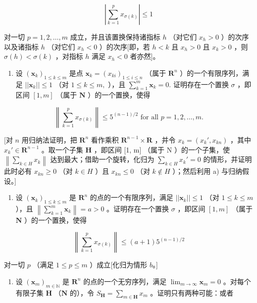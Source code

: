 \[
\left| \sum_ {k = 1} ^ {p} x _ {\sigma (k)} \right| \leqslant 1
\]

对一切 \(p = 1, 2, \ldots, m\) 成立，并且该置换保持诸指标 \(h\) （对它们 \(x_h > 0\) ）的次序以及诸指标 \(h\) （对它们 \(x_h < 0\) ）的次序{[}即，若 \(h < k\) 且 \(x_h > 0\) 且 \(x_k > 0\) ，则 \(\sigma(h) < \sigma(k)\) ，对指标 \(h\) 满足 \(x_h < 0\) 者亦然{]}。

\begin{enumerate}
\def\labelenumi{\alph{enumi})}
\setcounter{enumi}{1}
\tightlist
\item
  设 \((\pmb{x}_k)_{1\leqslant k\leqslant m}\) 是点 \(\pmb{x}_k = (x_{ki})_{1\leqslant i\leqslant n}\) （属于 \(\mathbf{R}^n\) ）的一个有限序列，满足 \(||\pmb{x}_k||\leqslant 1\) （对 \(1\leqslant k\leqslant m,\) ），且 \(\sum_{k = 1}^{m}\pmb{x}_k = 0.\) 证明存在一个置换 \(\sigma\) ，即区间 \([1, m]\) （属于 \(\mathbf{N}\) ）的一个置换，使得
\end{enumerate}

\[
\left\| \sum_ {k = 1} ^ {p} x _ {\sigma (k)} \right\| \leqslant 5 ^ {(n - 1) / 2} \text { for   all } p = 1, 2, \dots , m.
\]

{[}对 \(n\) 用归纳法证明，把 \(\mathbf{R}^n\) 看作乘积 \(\mathbf{R}^{n-1} \times \mathbf{R}\) ，并令 \(x_k = (x_k', x_{kn})\) ，其中 \(x_k' \in \mathbf{R}^{n-1}\) 。取一个子集 \(\mathbf{H}\) ，即区间 {[}1, m{]} （属于 N ）的一个子集，使 \(\left\|\sum_{k\in H}x_{k}\right\|\) 达到最大；借助一个旋转，化归为 \(\sum_{k\in H}x_{k}'=0\) 的情形，并证明此时必有 \(x_{kn}\geqslant0\) （对 \(k\in H\) ）且 \(x_{kn}\leqslant0\) （对 \(k\notin H\) ）；然后利用 a) 与归纳假设。{]}

\begin{enumerate}
\def\labelenumi{\alph{enumi})}
\setcounter{enumi}{2}
\tightlist
\item
  设 \((\pmb{x}_k)_{1 \leqslant k \leqslant m}\) 是 \(\mathbf{R}^n\) 的点的一个有限序列，满足 \(||\pmb{x}_k|| \leqslant 1\) （对 \(1 \leqslant k \leqslant m\) ），且 \(\left\| \sum_{k=1}^{m} \pmb{x}_k \right\| = a > 0\) 。证明存在一个置换 \(\sigma\) ，即区间 \([1, m]\) （属于 \(\mathbf{N}\) ）的一个置换，使得
\end{enumerate}

\[
\left\| \sum_ {k = 1} ^ {p} x _ {\sigma (k)} \right\| \leqslant (a + 1) 5 ^ {(n - 1) / 2}
\]

对一切 \(p\) （满足 \(1 \leqslant p \leqslant m\) ）成立{[}化归为情形 \(b\)。{]}

\begin{enumerate}
\def\labelenumi{\arabic{enumi})}
\setcounter{enumi}{1}
\tightlist
\item
  设 \((\pmb{x}_m)_{m\in \mathbb{N}}\) 是 \(\mathbf{R}^n\) 的点的一个无穷序列，满足 \(\lim_{m\to \infty}\pmb{x}_m = 0\) 。对每个有限子集 \(\mathbf{H}\) （\(\mathbf{N}\) 的），令 \(S_{\mathbf{H}} = \sum_{m\in \mathbf{H}}x_m\) 。证明只有两种可能：或者
\end{enumerate}

